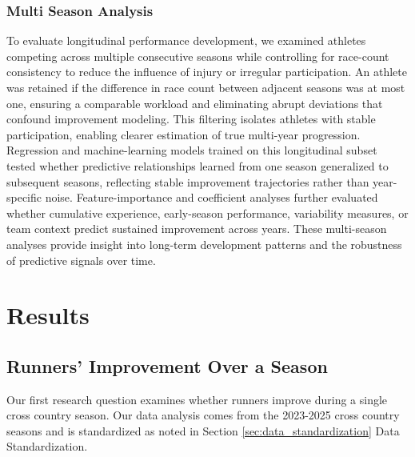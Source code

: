 \documentclass[suppldata]{interact}
\theoremstyle{plain}%
\theoremstyle{definition}
\theoremstyle{remark}
\begin{document}
\subsubsection{Multi Season Analysis}
To evaluate longitudinal performance development, we examined athletes competing across multiple consecutive seasons while controlling for race-count consistency to reduce the influence of injury or irregular participation. An athlete was retained if the difference in race count between adjacent seasons was at most one, ensuring a comparable workload and eliminating abrupt deviations that confound improvement modeling. This filtering isolates athletes with stable participation, enabling clearer estimation of true multi-year progression. Regression and machine-learning models trained on this longitudinal subset tested whether predictive relationships learned from one season generalized to subsequent seasons, reflecting stable improvement trajectories rather than year-specific noise. Feature-importance and coefficient analyses further evaluated whether cumulative experience, early-season performance, variability measures, or team context predict sustained improvement across years. These multi-season analyses provide insight into long-term development patterns and the robustness of predictive signals over time.

\section{Results}




\subsection{Runners' Improvement Over a Season}
Our first research question examines whether runners improve during a single cross country season. Our data analysis comes from the 2023-2025 cross country seasons and is standardized as noted in Section \ref{sec:data_standardization} Data Standardization.
\end{document}
